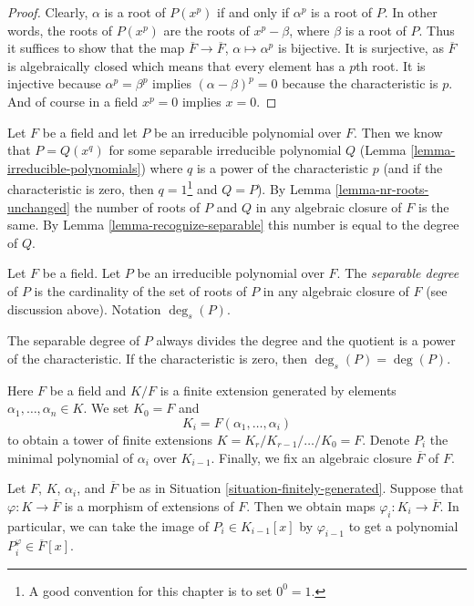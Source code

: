 \begin{proof}
Clearly, $\alpha$ is a root of $P(x^p)$ if and only if $\alpha^p$ is a
root of $P$. In other words, the roots of $P(x^p)$ are the roots of
$x^p - \beta$, where $\beta$ is a root of $P$. Thus it suffices to show
that the map $\overline{F} \to \overline{F}$, $\alpha \mapsto \alpha^p$
is bijective. It is surjective, as $\overline{F}$ is algebraically closed
which means that every element has a $p$th root. It is injective because
$\alpha^p = \beta^p$ implies $(\alpha - \beta)^p = 0$ because
the characteristic is $p$. And of course in a field $x^p = 0$ implies
$x = 0$.
\end{proof}

\noindent
Let $F$ be a field and let $P$ be an irreducible polynomial over $F$.
Then we know that $P = Q(x^q)$ for some separable irreducible polynomial $Q$
(Lemma \ref{lemma-irreducible-polynomials}) where $q$ is a power of
the characteristic $p$ (and if the characteristic is zero, then
$q = 1$\footnote{A good convention for this chapter is to set $0^0 = 1$.}
and $Q = P$). By Lemma \ref{lemma-nr-roots-unchanged} the number of
roots of $P$ and $Q$ in any algebraic closure of $F$ is the same.
By Lemma \ref{lemma-recognize-separable} this number is equal to the degree
of $Q$.

\begin{definition}
\label{definition-separable-degree}
Let $F$ be a field. Let $P$ be an irreducible polynomial over $F$.
The {\it separable degree} of $P$ is the cardinality of the
set of roots of $P$ in any algebraic closure of $F$ (see discussion
above). Notation $\deg_s(P)$.
\end{definition}

\noindent
The separable degree of $P$ always divides the degree and the quotient
is a power of the characteristic. If the characteristic is zero, then
$\deg_s(P) = \deg(P)$.

\begin{situation}
\label{situation-finitely-generated}
Here $F$ be a field and $K/F$ is a finite extension generated by elements
$\alpha_1, \ldots, \alpha_n \in K$. We set $K_0 = F$ and
$$
K_i = F(\alpha_1, \dots, \alpha_i)
$$
to obtain a tower of finite extensions
$K = K_r / K_{r - 1} / \ldots / K_0 = F$.
Denote $P_i$ the minimal polynomial of $\alpha_i$ over $K_{i - 1}$.
Finally, we fix an algebraic closure $\overline{F}$ of $F$.
\end{situation}

\noindent
Let $F$, $K$, $\alpha_i$, and $\overline{F}$ be as in
Situation \ref{situation-finitely-generated}.
Suppose that $\varphi : K \to \overline{F}$ is a morphism of extensions
of $F$. Then we obtain maps $\varphi_i : K_i \to \overline{F}$.
In particular, we can take the image of $P_i \in K_{i - 1}[x]$ by
$\varphi_{i - 1}$ to get a polynomial $P_i^\varphi \in \overline{F}[x]$.

